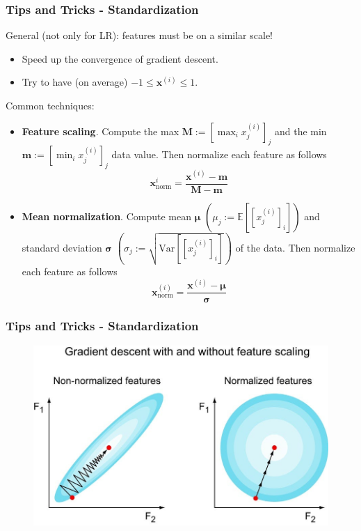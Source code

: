 \documentclass{beamer}
\begin{document}
	\begin{frame}
		\frametitle{Tips and Tricks - Standardization}
		General (not only for LR): features must be on a similar scale!
		\begin{itemize}
			\item Speed up the convergence of gradient descent.
			\item Try to have (on average) $-1 \leq \bm{x}^{(i)} \leq 1$.
		\end{itemize}
		Common techniques:
		\begin{itemize}
			\item \textbf{Feature scaling}. Compute the max $\bm{M} := [\max_i x^{(i)}_j]_j$ and the min $\bm{m} := [\min_i x^{(i)}_j]_j$ data value. Then normalize each feature as follows
			\begin{equation*}
				\bm{x}_{\text{norm}}^i = \frac{\bm{x}^{(i)} - \bm{m}}{\bm{M} - \bm{m}}
			\end{equation*} 
			\item \textbf{Mean normalization}. Compute mean $\bm{\mu}$ $(\mu_j := \mathbb{E}[[x^{(i)}_j]_i])$ and standard deviation $\bm{\sigma}$ $(\sigma_j := \sqrt{\text{Var}[[x^{(i)}_j]_i]})$ of the data. Then normalize each feature as follows
			\begin{equation*}
				\bm{x}_{\text{norm}}^{(i)} = \frac{\bm{x}^{(i)} -\bm{\mu}}{\bm{\sigma}} 
			\end{equation*}
		\end{itemize}
	\end{frame}

	\begin{frame}
		\frametitle{Tips and Tricks - Standardization}
		\begin{figure}
			\centering
			\includegraphics[scale=0.35]{images/feature-scaling}
		\end{figure}

		
	\end{frame}
\end{document}
